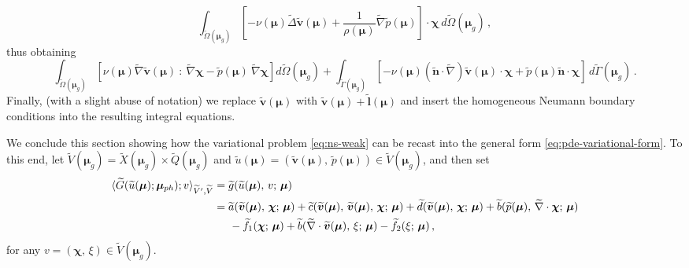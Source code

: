 \documentclass[12pt, a4paper, twoside, openright, notitlepage]{report}
\numberwithin{equation}{chapter}
\theoremstyle{theorem}
\theoremstyle{definition}
\theoremstyle{remark}
\theoremstyle{proposition}
\numberwithin{figure}{chapter}
\newcommand{\wt}[1]{\widetilde{#1}}
\newcommand{\bg}[1]{\boldsymbol{#1}}
\begin{document}
		\begin{equation*}
			\int_{\wt{\Omega}(\bg{\mu}_g)} \left[ - \nu(\bg{\mu}) \wt{\Delta} \wt{\bg{v}}(\bg{\mu}) + \dfrac{1}{\rho(\bg{\mu})} \wt{\nabla} \wt{p}(\bg{\mu}) \right] \cdot \bg{\chi} \, d\wt{\Omega}(\bg{\mu}_g) \, ,
		\end{equation*}
		thus obtaining
		\begin{equation*}
			\int_{\wt{\Omega}(\bg{\mu}_g)} \left[ \nu(\bg{\mu}) \wt{\nabla} \wt{\bg{v}}(\bg{\mu}) ~ : ~ \wt{\nabla} \bg{\chi} - \wt{p}(\bg{\mu}) ~ \wt{\nabla} \bg{\chi} \right] d\wt{\Omega}(\bg{\mu}_g) + \int_{\wt{\Gamma}(\bg{\mu}_g)} \left[ - \nu(\bg{\mu}) \left( \wt{\bg{n}} \cdot \wt{\nabla} \right) \wt{\bg{v}}(\bg{\mu}) \cdot \bg{\chi} + \wt{p}(\bg{\mu}) \wt{\bg{n}} \cdot \bg{\chi} \right] \, d\wt{\Gamma}(\bg{\mu}_g) \, .
		\end{equation*}
		Finally, (with a slight abuse of notation) we replace $\wt{\bg{v}}(\bg{\mu})$ with $\wt{\bg{v}}(\bg{\mu}) + \wt{\bg{l}}(\bg{\mu})$ and insert the homogeneous Neumann boundary conditions into the resulting integral equations.
		
		We conclude this section showing how the variational problem \eqref{eq:ns-weak} can be recast into the general form \eqref{eq:pde-variational-form}. To this end, let $\wt{V}(\bg{\mu}_g) = \wt{X}(\bg{\mu}_g) \times \wt{Q}(\bg{\mu}_g)$ and $\wt{u}(\bg{\mu}) = (\wt{\bg{v}}(\bg{\mu}), \, \wt{p}(\bg{\mu})) \in \wt{V}(\bg{\mu}_g)$, and then set
		\begin{equation*}
			\begin{aligned}
				\langle \wt{G}(\wt{u}(\bg{\mu}); \bg{\mu}_{ph}); v \rangle_{\wt{V}',\wt{V}} & = \wt{g}(\wt{u}(\bg{\mu}), \, v; \, \bg{\mu}) \\
				& = \wt{a}(\wt{\bg{v}}(\bg{\mu}), \, \bg{\chi}; \, \bg{\mu}) + \wt{c}(\wt{\bg{v}}(\bg{\mu}), \, \wt{\bg{v}}(\bg{\mu}), \, \bg{\chi}; \, \bg{\mu}) + \wt{d}(\wt{\bg{v}}(\bg{\mu}), \, \bg{\chi}; \, \bg{\mu}) + \wt{b}(\wt{p}(\bg{\mu}), \, \wt{\nabla} \cdot \bg{\chi}; \, \bg{\mu}) \\
				& \hspace*{0.5cm} - \wt{f}_1(\bg{\chi}; \, \bg{\mu}) + \wt{b}(\wt{\nabla} \cdot \wt{\bg{v}}(\bg{\mu}), \, \xi; \, \bg{\mu}) - \wt{f}_2(\xi; \, \bg{\mu}) \, ,
			\end{aligned}
		\end{equation*}
		for any $v = (\bg{\chi}, \, \xi) \in \wt{V}(\bg{\mu}_g)$.
		
	\vspace*{0.3cm}
		
\end{document}
